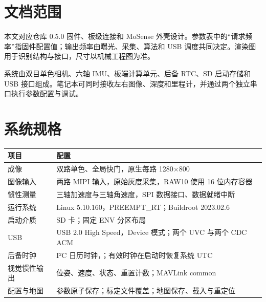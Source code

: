 
\newcommand{\DocName}{产品规格书}
\newcommand{\DocCode}{MV-SPEC-001}

\tableofcontents
\vspace{8mm}
\section*{文档范围}
本文对应仓库 0.5.0 固件、板级连接和 MoSense 外壳设计。参数表中的“请求频率”指固件配置值；输出频率由曝光、采集、算法和 USB 调度共同决定。渲染图用于识别结构与接口，尺寸以机械工程图为准。

系统由双目单色相机、六轴 IMU、板端计算单元、后备 RTC、SD 启动存储和 USB 接口组成。笔记本可同时接收左右图像、深度和里程计，并通过两个独立串口执行参数配置与调试。
\newpage
\section{系统规格}
\par\noindent\begin{tabularx}{\linewidth}{@{}p{31mm}Y@{}}\toprule
项目 & 配置\\\midrule
成像 & 双路单色、全局快门，原生每路 1280$\times$800\\
图像输入 & 两路 MIPI 输入，原始灰度采集，RAW10 使用 16 位内存容器\\
惯性测量 & 三轴加速度与三轴角速度，SPI 数据接口、数据就绪中断\\
运行系统 & Linux 5.10.160，PREEMPT\_RT；Buildroot 2023.02.6\\
启动介质 & SD 卡；固定 ENV 分区布局\\
USB & USB 2.0 High Speed，Device 模式；两个 UVC 与两个 CDC ACM\\
后备时钟 & I²C 日历时钟，；有效时钟在启动时恢复系统 UTC\\
视觉惯性输出 & 位姿、速度、状态、重置计数；MAVLink common\\
配置与地图 & 参数原子保存；标定文件覆盖；地图保存、载入与重定位\\\bottomrule
\end{tabularx}\par

